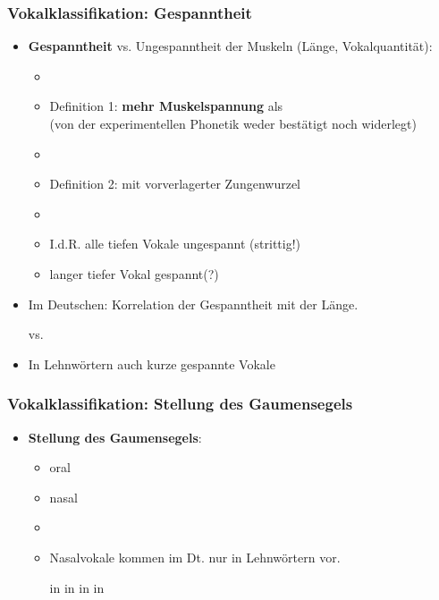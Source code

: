 \begin{frame}
\frametitle{Vokalklassifikation: Gespanntheit}

	\begin{itemize}
		\item \textbf{Gespanntheit} vs. Ungespanntheit der Muskeln (Länge, Vokalquantität):
		
		\begin{itemize}
			\item[]
			\item Definition 1: \textipa{[ i:, y:, u:, o: ]} \textbf{mehr Muskelspannung} als \textipa{[ I, Y, U , O ]}\\
			(von der experimentellen Phonetik weder bestätigt noch widerlegt)
			\item[]
			\item Definition 2: mit vorverlagerter Zungenwurzel
			\item[]
			\item I.\;d.\;R. alle tiefen Vokale \ras ungespannt (strittig!)
			\item langer tiefer Vokal \textipa{[ a: ]} \ras gespannt(?)
		\end{itemize}

	      \item Im Deutschen: Korrelation der Gespanntheit mit der Länge.

		\ea \textipa{[ m i: t @ ]} vs. \textipa{[ m I t @ ]}
		\z

		\item In Lehnwörtern auch kurze gespannte Vokale

		\ea \textipa{[ P i . d e: ]}
		\z
		
	\end{itemize}
	
\end{frame}



\begin{frame}
\frametitle{Vokalklassifikation: Stellung des Gaumensegels}

	\begin{itemize}
	
		
		
		\item \textbf{Stellung des Gaumensegels}:
		
		\begin{itemize}
			\item oral
			\item nasal
			\item[]
			\item Nasalvokale kommen im Dt. nur in Lehnwörtern vor.

			\eal
			\ex \textipa{[ \~a ]} in 
			\ex \textipa{[ \~E ]} in 
			\ex \textipa{[ \~a ]} in 
			\ex \textipa{[ \~\oe\ ]} in 
			\zl
		
		\end{itemize}
		
	\end{itemize}
	
\end{frame}


